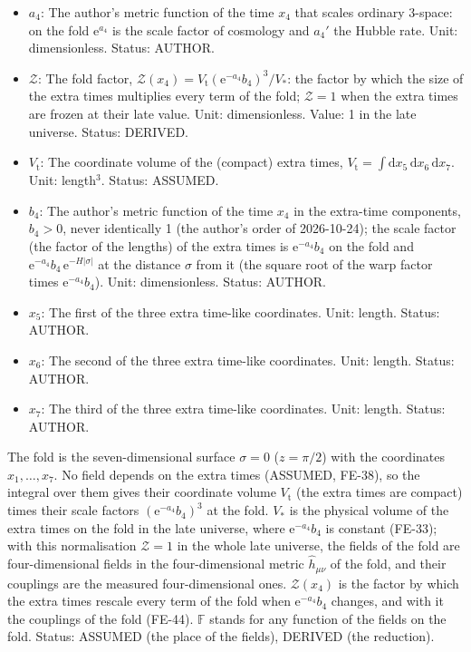 \documentclass[
  10pt,
]{article}
\begin{document}
\begin{itemize}
  \(\mathrm{e}\): Euler's number, the base of the natural logarithm;
  \(\mathrm{e}^{X}\) is the exponential of \(X\). Unit: dimensionless.
  Value: 2.718281828. Status: STANDARD.
\item
  \(a_4\): The author's metric function of the time \(x_4\) that scales
  ordinary 3-space: on the fold \(\mathrm{e}^{a_4}\) is the scale factor
  of cosmology and \(a_4'\) the Hubble rate. Unit: dimensionless.
  Status: AUTHOR.
\item
  \(\mathcal{Z}\): The fold factor,
  \(\mathcal{Z}(x_4) = V_{\mathrm{t}}(\mathrm{e}^{-a_4}b_4)^3/V_*\): the
  factor by which the size of the extra times multiplies every term of
  the fold; \(\mathcal{Z} = 1\) when the extra times are frozen at their
  late value. Unit: dimensionless. Value: 1 in the late universe.
  Status: DERIVED.
\item
  \(V_{\mathrm{t}}\): The coordinate volume of the (compact) extra
  times,
  \(V_{\mathrm{t}} = \int\mathrm{d}x_5\,\mathrm{d}x_6\,\mathrm{d}x_7\).
  Unit: length\(^3\). Status: ASSUMED.
\item
  \(b_4\): The author's metric function of the time \(x_4\) in the
  extra-time components, \(b_4 > 0\), never identically 1 (the author's
  order of 2026-10-24); the scale factor (the factor of the lengths) of
  the extra times is \(\mathrm{e}^{-a_4}b_4\) on the fold and
  \(\mathrm{e}^{-a_4}b_4\,\mathrm{e}^{-H\lvert\sigma\rvert}\) at the
  distance \(\sigma\) from it (the square root of the warp factor times
  \(\mathrm{e}^{-a_4}b_4\)). Unit: dimensionless. Status: AUTHOR.
\item
  \(x_5\): The first of the three extra time-like coordinates. Unit:
  length. Status: AUTHOR.
\item
  \(x_6\): The second of the three extra time-like coordinates. Unit:
  length. Status: AUTHOR.
\item
  \(x_7\): The third of the three extra time-like coordinates. Unit:
  length. Status: AUTHOR.
\end{itemize}

The fold is the seven-dimensional surface \(\sigma = 0\) (\(z = \pi/2\))
with the coordinates \(x_1, \dots, x_7\). No field depends on the extra
times (ASSUMED, FE-38), so the integral over them gives their coordinate
volume \(V_{\mathrm{t}}\) (the extra times are compact) times their
scale factors \((\mathrm{e}^{-a_4}b_4)^3\) at the fold. \(V_*\) is the
physical volume of the extra times on the fold in the late universe,
where \(\mathrm{e}^{-a_4}b_4\) is constant (FE-33); with this
normalisation \(\mathcal{Z} = 1\) in the whole late universe, the fields
of the fold are four-dimensional fields in the four-dimensional metric
\(\hat h_{\mu\nu}\) of the fold, and their couplings are the measured
four-dimensional ones. \(\mathcal{Z}(x_4)\) is the factor by which the
extra times rescale every term of the fold when \(\mathrm{e}^{-a_4}b_4\)
changes, and with it the couplings of the fold (FE-44). \(\mathbb{F}\)
stands for any function of the fields on the fold. Status: ASSUMED (the
place of the fields), DERIVED (the reduction).
\end{document}
